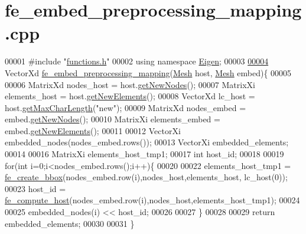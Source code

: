 \hypertarget{fe__embed__preprocessing__mapping_8cpp_source}{}\section{fe\+\_\+embed\+\_\+preprocessing\+\_\+mapping.\+cpp}
\label{fe__embed__preprocessing__mapping_8cpp_source}

\begin{DoxyCode}
00001 \textcolor{preprocessor}{#include "\hyperlink{functions_8h}{functions.h}"}
00002 \textcolor{keyword}{using namespace }\hyperlink{namespace_eigen}{Eigen};
00003 
\hyperlink{fe__embed__preprocessing__mapping_8cpp_a0600721e5cf84d84408ce9605b004610}{00004} VectorXd \hyperlink{fe__embed__preprocessing__mapping_8cpp_a0600721e5cf84d84408ce9605b004610}{fe\_embed\_preprocessing\_mapping}(\hyperlink{class_mesh}{Mesh} host, 
      \hyperlink{class_mesh}{Mesh} embed)\{
00005 
00006     MatrixXd nodes\_host = host.\hyperlink{class_mesh_a52ecce406bbef80cbf3610db3ea5ea40}{getNewNodes}();
00007     MatrixXi elements\_host = host.\hyperlink{class_mesh_a6e425e9499e64ab52c4555aa3763651d}{getNewElements}();
00008     VectorXd lc\_host = host.\hyperlink{class_mesh_a72d2a3863b85a2a2aed7deca8ce37832}{getMaxCharLength}(\textcolor{stringliteral}{"new"});
00009     MatrixXd nodes\_embed = embed.\hyperlink{class_mesh_a52ecce406bbef80cbf3610db3ea5ea40}{getNewNodes}();
00010     MatrixXi elements\_embed = embed.\hyperlink{class_mesh_a6e425e9499e64ab52c4555aa3763651d}{getNewElements}();
00011 
00012     VectorXi embedded\_nodes(nodes\_embed.rows());
00013     VectorXi embedded\_elements;
00014 
00016     MatrixXi elements\_host\_tmp1;
00017     \textcolor{keywordtype}{int} host\_id;
00018 
00019     \textcolor{keywordflow}{for}(\textcolor{keywordtype}{int} i=0;i<nodes\_embed.rows();i++)\{
00020 
00022         elements\_host\_tmp1 = \hyperlink{functions_8h_a150d77644eb280d58564e3ff4885e73c}{fe\_create\_bbox}(nodes\_embed.row(i),nodes\_host,elements\_host,
      lc\_host(0));
00023         host\_id = \hyperlink{functions_8h_a453ba6bc1e7d5a63db9d56beb6077a27}{fe\_compute\_host}(nodes\_embed.row(i),nodes\_host,elements\_host\_tmp1);
00024 
00025         embedded\_nodes(i) << host\_id; 
00026 
00027     \}
00028 
00029     \textcolor{keywordflow}{return} embedded\_elements;
00030 
00031 \}
\end{DoxyCode}
